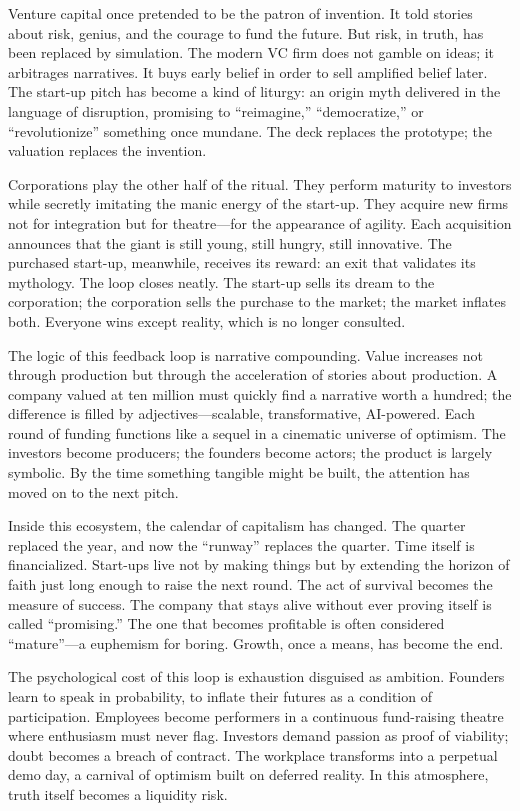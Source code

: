 \documentclass[11pt,twoside]{book}
\begin{document}
Venture capital once pretended to be the patron of invention.  It told stories about risk, genius, and the courage to fund the future.  But risk, in truth, has been replaced by simulation.  The modern VC firm does not gamble on ideas; it arbitrages narratives.  It buys early belief in order to sell amplified belief later.  The start-up pitch has become a kind of liturgy: an origin myth delivered in the language of disruption, promising to “reimagine,” “democratize,” or “revolutionize” something once mundane.  The deck replaces the prototype; the valuation replaces the invention.

Corporations play the other half of the ritual.  They perform maturity to investors while secretly imitating the manic energy of the start-up.  They acquire new firms not for integration but for theatre—for the appearance of agility.  Each acquisition announces that the giant is still young, still hungry, still innovative.  The purchased start-up, meanwhile, receives its reward: an exit that validates its mythology.  The loop closes neatly.  The start-up sells its dream to the corporation; the corporation sells the purchase to the market; the market inflates both.  Everyone wins except reality, which is no longer consulted.

The logic of this feedback loop is narrative compounding.  Value increases not through production but through the acceleration of stories about production.  A company valued at ten million must quickly find a narrative worth a hundred; the difference is filled by adjectives—scalable, transformative, AI-powered.  Each round of funding functions like a sequel in a cinematic universe of optimism.  The investors become producers; the founders become actors; the product is largely symbolic.  By the time something tangible might be built, the attention has moved on to the next pitch.

Inside this ecosystem, the calendar of capitalism has changed.  The quarter replaced the year, and now the “runway” replaces the quarter.  Time itself is financialized.  Start-ups live not by making things but by extending the horizon of faith just long enough to raise the next round.  The act of survival becomes the measure of success.  The company that stays alive without ever proving itself is called “promising.”  The one that becomes profitable is often considered “mature”—a euphemism for boring.  Growth, once a means, has become the end.

The psychological cost of this loop is exhaustion disguised as ambition.  Founders learn to speak in probability, to inflate their futures as a condition of participation.  Employees become performers in a continuous fund-raising theatre where enthusiasm must never flag.  Investors demand passion as proof of viability; doubt becomes a breach of contract.  The workplace transforms into a perpetual demo day, a carnival of optimism built on deferred reality.  In this atmosphere, truth itself becomes a liquidity risk.
\end{document}
